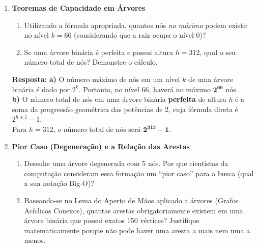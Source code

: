 \documentclass[12pt]{article}
\newcommand{\quadro}[1]{\vspace{0.2cm}\begin{tcolorbox}[colback=green!5, colframe=forestgreen, boxrule=0.5pt, arc=0pt] \textbf{Resposta:} #1 \end{tcolorbox}}
\begin{document}
\begin{enumerate}[label=\textbf{\arabic*.}]
\item \textbf{Teoremas de Capacidade em Árvores}
\begin{enumerate}[label=\alph*)]
    \item Utilizando a fórmula apropriada, quantos nós \textit{no máximo} podem existir no nível $k=66$ (considerando que a raiz ocupa o nível 0)?
    \item Se uma árvore binária é perfeita e possui altura $h=312$, qual o seu número total de nós? Demonstre o cálculo.
\end{enumerate}

\quadro{
\textbf{a)} O número máximo de nós em um nível $k$ de uma árvore binária é dado por $2^k$. Portanto, no nível 66, haverá no máximo $\mathbf{2^{66}}$ nós. \\
\textbf{b)} O número total de nós em uma árvore binária \textbf{perfeita} de altura $h$ é a soma da progressão geométrica das potências de 2, cuja fórmula direta é $2^{h+1} - 1$. \\
Para $h = 312$, o número total de nós será $\mathbf{2^{313} - 1}$.
}

\item \textbf{Pior Caso (Degeneração) e a Relação das Arestas}
\begin{enumerate}[label=\alph*)]
    \item Desenhe uma árvore degenerada com 5 nós. Por que cientistas da computação consideram essa formação um ``pior caso'' para a busca (qual a sua notação Big-O)?
    \item Baseando-se no Lema do Aperto de Mãos aplicado a árvores (Grafos Acíclicos Conexos), quantas arestas obrigatoriamente existem em uma árvore binária que possui exatos 150 vértices? Justifique matematicamente porque não pode haver uma aresta a mais nem uma a menos.
\end{enumerate}


\end{enumerate}
\end{document}
